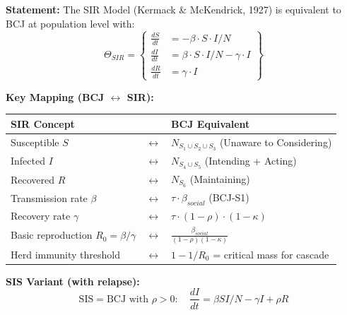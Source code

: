 
\begin{tcolorbox}[colback=green!5!white, colframe=green!75!black,
    title=Theorem BCJ-T19: SIR Epidemiological Model as Special Case]
\textbf{Statement:} The SIR Model (Kermack \& McKendrick, 1927) is equivalent to BCJ at population level with:
\begin{equation}
\Theta_{SIR} = \left\{
\begin{aligned}
\frac{dS}{dt} &= -\beta \cdot S \cdot I / N \\
\frac{dI}{dt} &= \beta \cdot S \cdot I / N - \gamma \cdot I \\
\frac{dR}{dt} &= \gamma \cdot I
\end{aligned}
\right\}
\end{equation}

\textbf{Key Mapping (BCJ $\leftrightarrow$ SIR):}
\begin{center}
\begin{tabular}{lcl}
\toprule
\textbf{SIR Concept} & & \textbf{BCJ Equivalent} \\
\midrule
Susceptible $S$ & $\leftrightarrow$ & $N_{S_1 \cup S_2 \cup S_3}$ (Unaware to Considering) \\
Infected $I$ & $\leftrightarrow$ & $N_{S_4 \cup S_5}$ (Intending + Acting) \\
Recovered $R$ & $\leftrightarrow$ & $N_{S_6}$ (Maintaining) \\
Transmission rate $\beta$ & $\leftrightarrow$ & $\tau \cdot \beta_{social}$ (BCJ-S1) \\
Recovery rate $\gamma$ & $\leftrightarrow$ & $\tau \cdot (1 - \rho) \cdot (1 - \kappa)$ \\
Basic reproduction $R_0 = \beta/\gamma$ & $\leftrightarrow$ & $\frac{\beta_{social}}{(1-\rho)(1-\kappa)}$ \\
Herd immunity threshold & $\leftrightarrow$ & $1 - 1/R_0$ = critical mass for cascade \\
\bottomrule
\end{tabular}
\end{center}

\textbf{SIS Variant (with relapse):}
\begin{equation}
\text{SIS} = \text{BCJ with } \rho > 0: \quad \frac{dI}{dt} = \beta SI/N - \gamma I + \rho R
\end{equation}


\end{tcolorbox}
